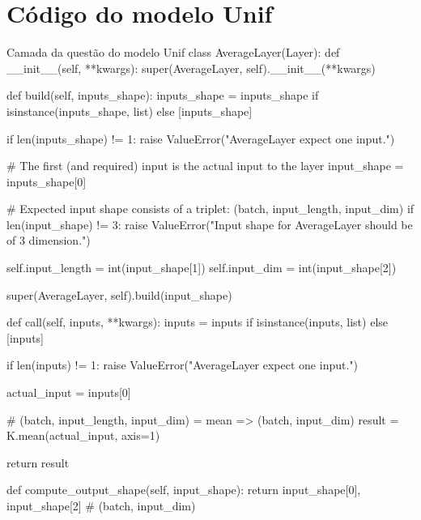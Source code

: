 \section{Código do modelo Unif}


\begin{mypython-linenumber}{Camada da questão do modelo Unif}
class AverageLayer(Layer):
    def __init__(self, **kwargs):
        super(AverageLayer, self).__init__(**kwargs)

    def build(self, inputs_shape):
        inputs_shape = inputs_shape if isinstance(inputs_shape, list) else [inputs_shape]

        if len(inputs_shape) != 1:
            raise ValueError("AverageLayer expect one input.")

        # The first (and required) input is the actual input to the layer
        input_shape = inputs_shape[0]

        # Expected input shape consists of a triplet: (batch, input_length, input_dim)
        if len(input_shape) != 3:
            raise ValueError("Input shape for AverageLayer should be of 3 dimension.")

        self.input_length = int(input_shape[1])
        self.input_dim = int(input_shape[2])

        super(AverageLayer, self).build(input_shape)

    def call(self, inputs, **kwargs):
        inputs = inputs if isinstance(inputs, list) else [inputs]

        if len(inputs) != 1:
            raise ValueError("AverageLayer expect one input.")

        actual_input = inputs[0]

        # (batch, input_length, input_dim) = mean => (batch, input_dim)
        result = K.mean(actual_input, axis=1)

        return result

    def compute_output_shape(self, input_shape):
        return input_shape[0], input_shape[2] # (batch, input_dim)
\end{mypython-linenumber}


\vspace{2cm}


